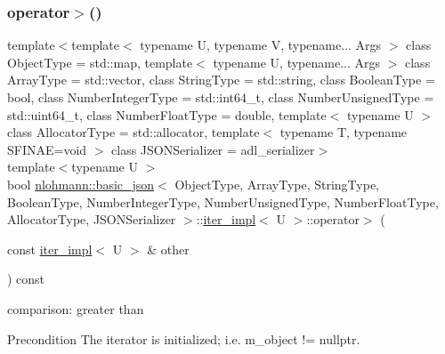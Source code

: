 \subsubsection{\texorpdfstring{operator$>$()}{operator>()}}
{\footnotesize\ttfamily template$<$template$<$ typename U, typename V, typename... Args $>$ class Object\+Type = std\+::map, template$<$ typename U, typename... Args $>$ class Array\+Type = std\+::vector, class String\+Type  = std\+::string, class Boolean\+Type  = bool, class Number\+Integer\+Type  = std\+::int64\+\_\+t, class Number\+Unsigned\+Type  = std\+::uint64\+\_\+t, class Number\+Float\+Type  = double, template$<$ typename U $>$ class Allocator\+Type = std\+::allocator, template$<$ typename T, typename S\+F\+I\+N\+A\+E=void $>$ class J\+S\+O\+N\+Serializer = adl\+\_\+serializer$>$ \\
template$<$typename U $>$ \\
bool \hyperlink{classnlohmann_1_1basic__json}{nlohmann\+::basic\+\_\+json}$<$ Object\+Type, Array\+Type, String\+Type, Boolean\+Type, Number\+Integer\+Type, Number\+Unsigned\+Type, Number\+Float\+Type, Allocator\+Type, J\+S\+O\+N\+Serializer $>$\+::\hyperlink{classnlohmann_1_1basic__json_1_1iter__impl}{iter\+\_\+impl}$<$ U $>$\+::operator$>$ (\begin{DoxyParamCaption}\item[{const \hyperlink{classnlohmann_1_1basic__json_1_1iter__impl}{iter\+\_\+impl}$<$ U $>$ \&}]{other }\end{DoxyParamCaption}) const\hspace{0.3cm}{\ttfamily [inline]}}



comparison\+: greater than 

\begin{DoxyPrecond}{Precondition}
The iterator is initialized; i.\+e. {\ttfamily m\+\_\+object != nullptr}. 
\end{DoxyPrecond}
\mbox{\label{classnlohmann_1_1basic__json_1_1iter__impl_a53a239bddcbd557f335d275c806535c1}} 
